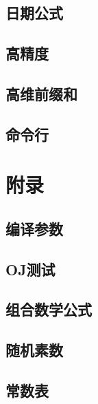 \subsection{日期公式}

\subsection{高精度}


\subsection{高维前缀和}


\subsection{命令行}

\section{附录}
\subsection{编译参数}

\subsection{OJ测试}

\subsection{组合数学公式}

\subsection{随机素数}

\subsection{常数表}
